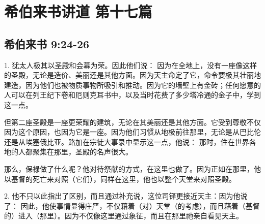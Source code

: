 

\section{希伯来书讲道 第十七篇}


\subsection{希伯来书 9:24-26}

\par

1. 犹太人极其以圣殿和会幕为荣。因此他们说：  因为在全地上，没有一座像这样的圣殿，无论是造价、美丽还是其他方面。因为天主命定了它，命令要极其壮丽地建造，因为他们也被物质事物所吸引和推动。因为它的墙壁上有金砖；任何愿意的人可以在列王纪下卷和厄则克耳书中，以及当时花费了多少塔冷通的金子中，学到这一点。\par

但第二座圣殿是一座更荣耀的建筑，无论在其美丽还是其他方面。它受到尊敬不仅因为这个原因，也因为它是一座。因为他们习惯从地极前往那里，无论是从巴比伦还是从埃塞俄比亚。路加在宗徒大事录中显示这一点，他说：   那时，住在世界各地的人都聚集在那里，圣殿的名声很大。\par

那么，保禄做了什么呢？他对待祭献的方式，在这里也做了。因为正如在那里，他以基督的死亡来对照（它们），同样在这里，他也以整个天堂来对照圣殿。\par

2. 他不只以此指出了区别，而且通过补充说，这位司铎更接近天主：因为他说了： 因此，他使事情显得庄严，不仅藉着（对）天堂（的考虑），而且藉着（基督的）进入（那里）。因为不仅像这里通过象征，而且在那里祂亲自看见天主。\par


